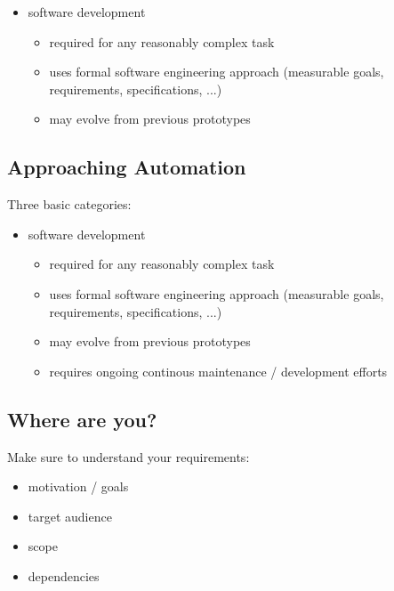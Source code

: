 \documentclass[xga]{xdvislides}
\begin{document}
\begin{itemize}
	\item software development
		\begin{itemize}
			\item required for any reasonably complex task
			\item uses formal software engineering approach (measurable goals,
				requirements, specifications, ...)
			\item may evolve from previous prototypes
		\end{itemize}
\end{itemize}


\subsection{Approaching Automation}
Three basic categories:
\\

\begin{itemize}
	\item software development
		\begin{itemize}
			\item required for any reasonably complex task
			\item uses formal software engineering approach (measurable goals,
				requirements, specifications, ...)
			\item may evolve from previous prototypes
			\item requires ongoing continous maintenance / development efforts
		\end{itemize}
\end{itemize}

\subsection{Where are you?}
Make sure to understand your requirements:

\begin{itemize}
	\item motivation / goals
	\item target audience
	\item scope
	\item dependencies
\end{itemize}
\end{document}
